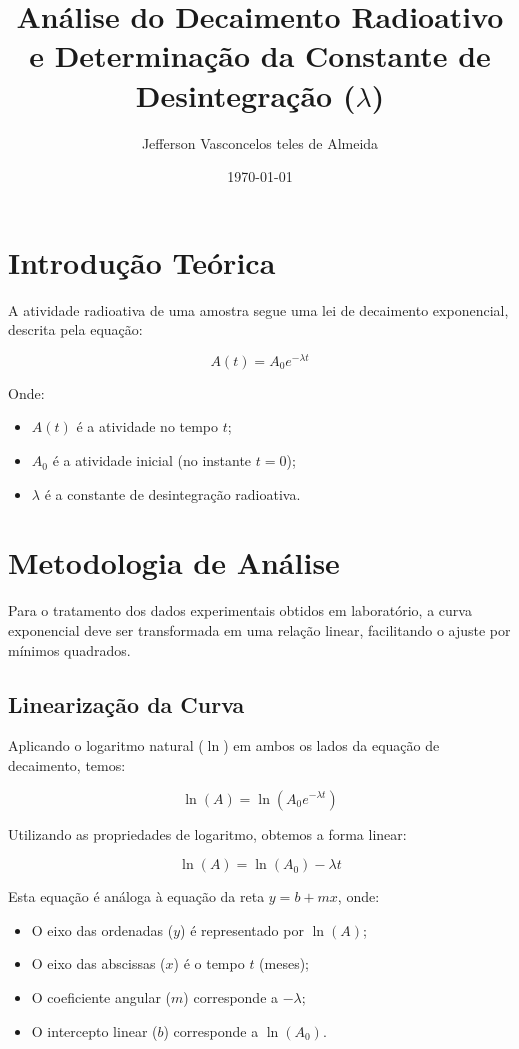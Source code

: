 \documentclass[12pt,a4paper]{article}
\title{Análise do Decaimento Radioativo e Determinação da Constante de Desintegração ($\lambda$)}
\author{Jefferson Vasconcelos teles de Almeida}
\date{\today}
\begin{document}
\maketitle

\section{Introdução Teórica}

A atividade radioativa de uma amostra segue uma lei de decaimento exponencial, descrita pela equação:

\begin{equation}
    A(t) = A_0 e^{-\lambda t}
\end{equation}

Onde:
\begin{itemize}
    \item $A(t)$ é a atividade no tempo $t$;
    \item $A_0$ é a atividade inicial (no instante $t = 0$);
    \item $\lambda$ é a constante de desintegração radioativa.
\end{itemize}

\section{Metodologia de Análise}

Para o tratamento dos dados experimentais obtidos em laboratório, a curva exponencial deve ser transformada em uma relação linear, facilitando o ajuste por mínimos quadrados.

\subsection{Linearização da Curva}

Aplicando o logaritmo natural ($\ln$) em ambos os lados da equação de decaimento, temos:

\begin{equation}
    \ln(A) = \ln(A_0 e^{-\lambda t})
\end{equation}

Utilizando as propriedades de logaritmo, obtemos a forma linear:

\begin{equation}
    \ln(A) = \ln(A_0) - \lambda t
\end{equation}

Esta equação é análoga à equação da reta $y = b + mx$, onde:
\begin{itemize}
    \item O eixo das ordenadas ($y$) é representado por $\ln(A)$;
    \item O eixo das abscissas ($x$) é o tempo $t$ (meses);
    \item O coeficiente angular ($m$) corresponde a $-\lambda$;
    \item O intercepto linear ($b$) corresponde a $\ln(A_0)$.
\end{itemize}
\end{document}
